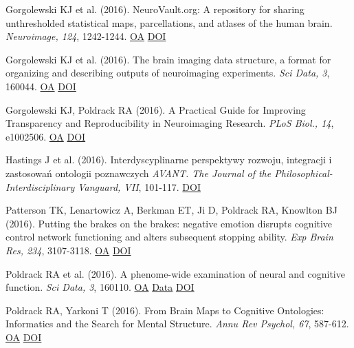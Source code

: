 Gorgolewski KJ et al. (2016). NeuroVault.org: A repository for sharing unthresholded statistical maps, parcellations, and atlases of the human brain. \textit{Neuroimage, 124}, 1242-1244. \href{https://www.ncbi.nlm.nih.gov/pmc/articles/PMC4806527}{OA} \href{http://dx.doi.org/10.1016/j.neuroimage.2015.04.016}{DOI} \vspace{2mm}

Gorgolewski KJ et al. (2016). The brain imaging data structure, a format for organizing and describing outputs of neuroimaging experiments. \textit{Sci Data, 3}, 160044. \href{https://www.ncbi.nlm.nih.gov/pmc/articles/PMC4978148}{OA} \href{http://dx.doi.org/10.1038/sdata.2016.44}{DOI} \vspace{2mm}

Gorgolewski KJ, Poldrack RA (2016). A Practical Guide for Improving Transparency and Reproducibility in Neuroimaging Research. \textit{PLoS Biol., 14}, e1002506. \href{https://www.ncbi.nlm.nih.gov/pmc/articles/PMC4936733}{OA} \href{http://dx.doi.org/10.1371/journal.pbio.1002506}{DOI} \vspace{2mm}

Hastings J et al. (2016). Interdyscyplinarne perspektywy rozwoju, integracji i zastosowań ontologii poznawczych \textit{AVANT. The Journal of the Philosophical-Interdisciplinary Vanguard, VII}, 101-117. \href{http://dx.doi.org/10.26913/70302016.0109.0007}{DOI} \vspace{2mm}

Patterson TK, Lenartowicz A, Berkman ET, Ji D, Poldrack RA, Knowlton BJ (2016). Putting the brakes on the brakes: negative emotion disrupts cognitive control network functioning and alters subsequent stopping ability. \textit{Exp Brain Res, 234}, 3107-3118. \href{https://www.ncbi.nlm.nih.gov/pmc/articles/PMC5073018}{OA} \href{http://dx.doi.org/10.1007/s00221-016-4709-2}{DOI} \vspace{2mm}

Poldrack RA et al. (2016). A phenome-wide examination of neural and cognitive function. \textit{Sci Data, 3}, 160110. \href{https://www.ncbi.nlm.nih.gov/pmc/articles/PMC5139672}{OA} \href{https://openneuro.org/datasets/ds000030/versions/1.0.0}{Data} \href{http://dx.doi.org/10.1038/sdata.2016.110}{DOI} \vspace{2mm}

Poldrack RA, Yarkoni T (2016). From Brain Maps to Cognitive Ontologies: Informatics and the Search for Mental Structure. \textit{Annu Rev Psychol, 67}, 587-612. \href{https://www.ncbi.nlm.nih.gov/pmc/articles/PMC4701616}{OA} \href{http://dx.doi.org/10.1146/annurev-psych-122414-033729}{DOI} \vspace{2mm}

